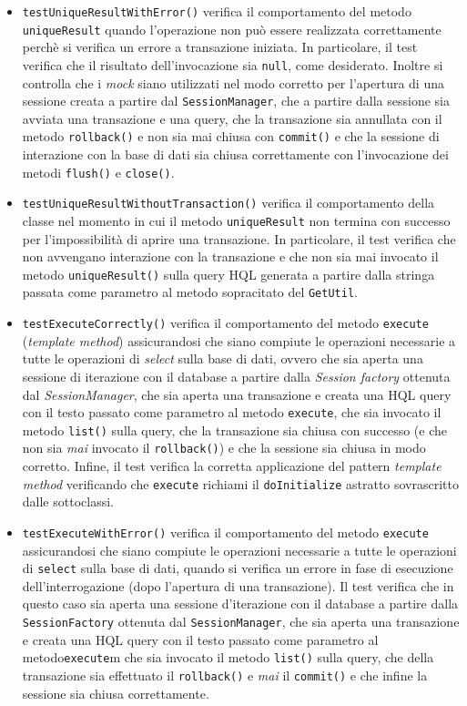 \begin{itemize}
\begin{itemize}
\item \texttt{testUniqueResultWithError()} verifica il comportamento del metodo \texttt{uniqueResult} quando l'operazione non può essere realizzata correttamente perchè si verifica un errore a transazione iniziata. In particolare, il test verifica che il risultato dell'invocazione sia \texttt{null}, come desiderato. Inoltre si controlla che i \textit{mock} siano utilizzati nel modo corretto per l'apertura di una sessione creata a partire dal \texttt{SessionManager}, che a partire dalla sessione sia avviata una transazione e una query, che la transazione sia annullata con il metodo \texttt{rollback()} e non sia mai chiusa con \texttt{commit()} e che la sessione di interazione con la base di dati sia chiusa correttamente con l'invocazione dei metodi \texttt{flush()} e \texttt{close()}.

\item \texttt{testUniqueResultWithoutTransaction()} verifica il comportamento della classe nel momento in cui il metodo \texttt{uniqueResult} non termina con successo per l'impossibilità di aprire una transazione. In particolare, il test verifica che non avvengano interazione con la transazione e che non sia mai invocato il metodo \texttt{uniqueResult()} sulla query HQL generata a partire dalla stringa passata come parametro al metodo sopracitato del \texttt{GetUtil}.

\item \texttt{testExecuteCorrectly()} verifica il comportamento del metodo \texttt{execute} (\textit{template method}) assicurandosi che siano compiute le operazioni necessarie a tutte le operazioni di \textit{select} sulla base di dati, ovvero che sia aperta una sessione di iterazione con il database a partire dalla \textit{Session factory} ottenuta dal \textit{SessionManager}, che sia aperta una transazione e creata una HQL query con il testo passato come parametro al metodo \texttt{execute}, che sia invocato il metodo \texttt{list()} sulla query, che la transazione sia chiusa con successo (e che non sia \textit{mai} invocato il \texttt{rollback()}) e che la sessione sia chiusa in modo corretto. Infine, il test verifica la corretta applicazione del pattern \textit{template method} verificando che \texttt{execute} richiami il \texttt{doInitialize} astratto sovrascritto dalle sottoclassi.

\item \texttt{testExecuteWithError()} verifica il comportamento del metodo \texttt{execute} assicurandosi che siano compiute le operazioni necessarie a tutte le operazioni di \texttt{select} sulla base di dati, quando si verifica un errore in fase di esecuzione dell'interrogazione (dopo l'apertura di una transazione). Il test verifica che in questo caso sia aperta una sessione d'iterazione con il database a partire dalla \texttt{SessionFactory} ottenuta dal \texttt{SessionManager}, che sia aperta una transazione e creata una HQL query con il testo passato come parametro al metodo\texttt{execute}m che sia invocato il metodo \texttt{list()} sulla query, che della transazione sia effettuato il \texttt{rollback()} e \textit{mai} il \texttt{commit()} e che infine la sessione sia chiusa correttamente.


\end{itemize}
\end{itemize}
